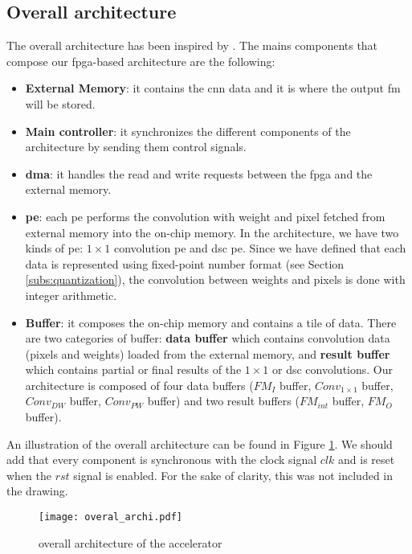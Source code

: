 \subsection{Overall architecture} \label{subsec:overal}
%
The overall architecture has been inspired by \textcite{zhu_efficient_2020}. The mains components that compose our \acrshort{fpga}-based architecture are the following:
%
\begin{itemize}
    \item \textbf{External Memory}: it contains the \acrshort{cnn} data and it is where the output \acrshort{fm} will be stored.
    \item \textbf{Main controller}: it synchronizes the different components of the architecture by sending them control signals.
    \item \textbf{\acrfull{dma}}: it handles the read and write requests between the \acrshort{fpga} and the external memory.
    \item \textbf{\acrshort{pe}}: each \acrshort{pe} performs the convolution with weight and pixel fetched from external memory into the on-chip memory. In the architecture, we have two kinds of \acrshort{pe}: $1 \times 1$ convolution \acrshort{pe} and \acrshort{dsc} \acrshort{pe}. Since we have defined that each data is represented using fixed-point number format (see Section \ref{subs:quantization}), the convolution between weights and pixels is done with integer arithmetic.
    \item \textbf{Buffer}: it composes the on-chip memory and contains a tile of data. There are two categories of buffer: \textbf{data buffer} which contains convolution data (pixels and weights) loaded from the external memory, and \textbf{result buffer} which contains partial or final results of the $1 \times 1$ or \acrshort{dsc} convolutions. Our architecture is composed of four data buffers ($FM_{I}$ buffer, $Conv_{1 \times 1}$ buffer, $Conv_{DW}$ buffer, $Conv_{PW}$ buffer) and two result buffers ($FM_{int}$ buffer, $FM_{O}$ buffer).
\end{itemize}
%
An illustration of the overall architecture can be found in Figure \ref{fig:overal_archi}. We should add that every component is synchronous with the clock signal $clk$ and is reset when the $rst$ signal is enabled. For the sake of clarity, this was not included in the drawing.
%
\begin{figure}[H]
    \centering
    \texttt{[image: overal\_archi.pdf]}
    \caption{overall architecture of the accelerator}
    \label{fig:overal_archi}
\end{figure}
%

